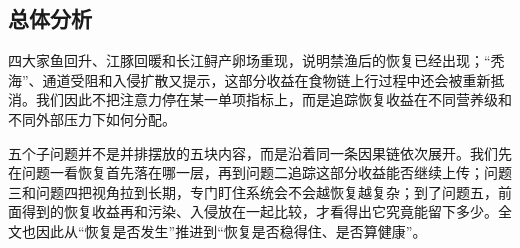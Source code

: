 \subsection{总体分析}
四大家鱼回升、江豚回暖和长江鲟产卵场重现，说明禁渔后的恢复已经出现；“秃海”、通道受阻和入侵扩散又提示，这部分收益在食物链上行过程中还会被重新抵消。我们因此不把注意力停在某一单项指标上，而是追踪恢复收益在不同营养级和不同外部压力下如何分配。

五个子问题并不是并排摆放的五块内容，而是沿着同一条因果链依次展开。我们先在问题一看恢复首先落在哪一层，再到问题二追踪这部分收益能否继续上传；问题三和问题四把视角拉到长期，专门盯住系统会不会越恢复越复杂；到了问题五，前面得到的恢复收益再和污染、入侵放在一起比较，才看得出它究竟能留下多少。全文也因此从“恢复是否发生”推进到“恢复是否稳得住、是否算健康”。

